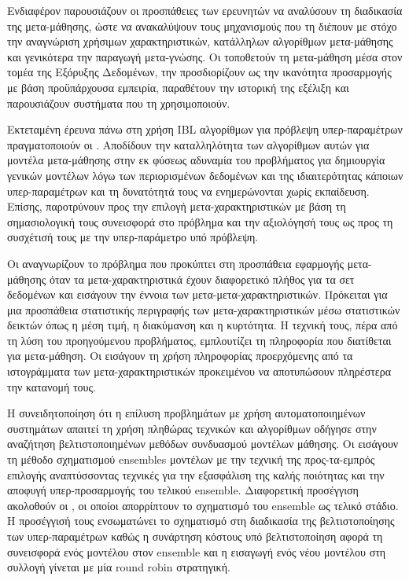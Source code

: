 Ενδιαφέρον παρουσιάζουν οι προσπάθειες των ερευνητών να αναλύσουν τη διαδικασία της μετα-μάθησης, ώστε να ανακαλύψουν τους μηχανισμούς που τη διέπουν με στόχο την αναγνώριση χρήσιμων χαρακτηριστικών, κατάλληλων αλγορίθμων μετα-μάθησης και γενικότερα την παραγωγή μετα-γνώσης. Οι \citet{Brazdil2009} τοποθετούν τη μετα-μάθηση μέσα στον τομέα της Εξόρυξης Δεδομένων, την προσδιορίζουν ως την ικανότητα προσαρμογής με βάση προϋπάρχουσα εμπειρία, παραθέτουν την ιστορική της εξέλιξη και παρουσιάζουν συστήματα που τη χρησιμοποιούν.

Εκτεταμένη έρευνα πάνω στη χρήση \gls{IBL} αλγορίθμων για πρόβλεψη υπερ-παραμέτρων πραγματοποιούν οι \citet{Abdulrahman:2014:MCA:3015544.3015557}. Αποδίδουν την καταλληλότητα των αλγορίθμων αυτών για μοντέλα μετα-μάθησης στην εκ φύσεως αδυναμία του προβλήματος για δημιουργία γενικών μοντέλων λόγω των περιορισμένων δεδομένων και της ιδιαιτερότητας κάποιων υπερ-παραμέτρων και τη δυνατότητά τους να ενημερώνονται χωρίς εκπαίδευση. Επίσης, παροτρύνουν προς την επιλογή μετα-χαρακτηριστικών με βάση τη σημασιολογική τους συνεισφορά στο πρόβλημα και την αξιολόγησή τους ως προς τη συσχέτισή τους με την υπερ-παράμετρο υπό πρόβλεψη. 

Οι \citet{Reif_meta2-features:} αναγνωρίζουν το πρόβλημα που προκύπτει στη προσπάθεια εφαρμογής μετα-μάθησης όταν τα μετα-χαρακτηριστικά έχουν διαφορετικό πλήθος για τα σετ δεδομένων και εισάγουν την έννοια των μετα-μετα-χαρακτηριστικών. Πρόκειται για μια προσπάθεια στατιστικής περιγραφής των μετα-χαρακτηριστικών μέσω στατιστικών δεικτών όπως η μέση τιμή, η διακύμανση και η κυρτότητα. Η τεχνική τους, πέρα από τη λύση του προηγούμενου προβλήματος, εμπλουτίζει τη πληροφορία που διατίθεται για μετα-μάθηση. Οι \citet{Bensusan:2001:EPA:645328.650030} εισάγουν τη χρήση πληροφορίας προερχόμενης από τα ιστογράμματα των μετα-χαρακτηριστικών προκειμένου να αποτυπώσουν πληρέστερα την κατανομή τους.

Η συνειδητοποίηση ότι η επίλυση προβλημάτων με χρήση αυτοματοποιημένων συστημάτων απαιτεί τη χρήση πληθώρας τεχνικών και αλγορίθμων οδήγησε στην αναζήτηση βελτιστοποιημένων μεθόδων συνδυασμού μοντέλων μάθησης. Οι \citet{Caruana:2004:ESL:1015330.1015432} εισάγουν τη μέθοδο σχηματισμού ensembles μοντέλων με την τεχνική της προς-τα-εμπρός επιλογής αναπτύσσοντας τεχνικές για την εξασφάλιση της καλής ποιότητας και την αποφυγή υπερ-προσαρμογής του τελικού ensemble. Διαφορετική προσέγγιση ακολοθούν οι \citet{ensemble}, οι οποίοι απορρίπτουν το σχηματισμό του ensemble ως τελικό στάδιο. Η προσέγγισή τους ενσωματώνει το σχηματισμό στη διαδικασία της βελτιστοποίησης των υπερ-παραμέτρων καθώς η συνάρτηση κόστους υπό βελτιστοποίηση αφορά τη συνεισφορά ενός μοντέλου στον ensemble και η εισαγωγή ενός νέου μοντέλου στη συλλογή γίνεται με μία round robin στρατηγική. 